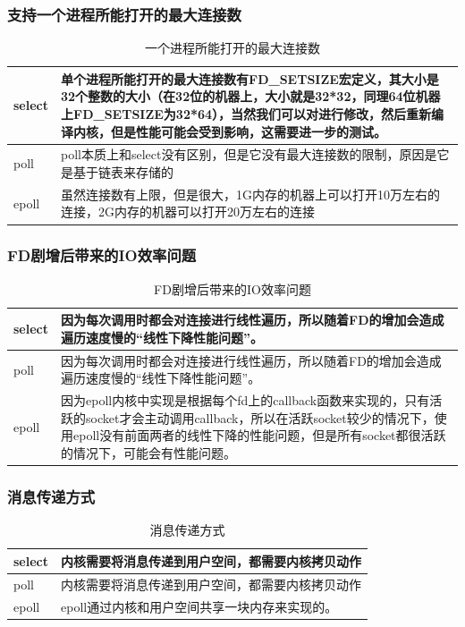 \documentclass[UTF8,a4paper,8pt]{ctexbook}
\begin{document}
			\subsubsection{支持一个进程所能打开的最大连接数}
				\begin{table}[H]
					\centering
					\caption{一个进程所能打开的最大连接数}
					\begin{tabular}{l|m{14cm}}
						\hline
						select		& 单个进程所能打开的最大连接数有FD\_SETSIZE宏定义，其大小是32个整数的大小（在32位的机器上，大小就是32*32，同理64位机器上FD\_SETSIZE为32*64），当然我们可以对进行修改，然后重新编译内核，但是性能可能会受到影响，这需要进一步的测试。\\
						\hline
						poll		& poll本质上和select没有区别，但是它没有最大连接数的限制，原因是它是基于链表来存储的\\
						\hline
						epoll		& 虽然连接数有上限，但是很大，1G内存的机器上可以打开10万左右的连接，2G内存的机器可以打开20万左右的连接\\
						\hline
					\end{tabular}
				\end{table}
			\subsubsection{FD剧增后带来的IO效率问题}
				\begin{table}[H]
					\centering
					\caption{FD剧增后带来的IO效率问题}
					\begin{tabular}{l|m{14cm}}
						\hline
						select		& 因为每次调用时都会对连接进行线性遍历，所以随着FD的增加会造成遍历速度慢的“线性下降性能问题”。\\
						\hline
						poll		& 因为每次调用时都会对连接进行线性遍历，所以随着FD的增加会造成遍历速度慢的“线性下降性能问题”。\\
						\hline
						epoll		& 因为epoll内核中实现是根据每个fd上的callback函数来实现的，只有活跃的socket才会主动调用callback，所以在活跃socket较少的情况下，使用epoll没有前面两者的线性下降的性能问题，但是所有socket都很活跃的情况下，可能会有性能问题。\\
						\hline
					\end{tabular}
				\end{table}
			\subsubsection{消息传递方式}
				\begin{table}[H]
					\centering
					\caption{消息传递方式}
					\begin{tabular}{l|m{14cm}}
						\hline
						select		& 内核需要将消息传递到用户空间，都需要内核拷贝动作\\
						\hline
						poll		& 内核需要将消息传递到用户空间，都需要内核拷贝动作\\
						\hline
						epoll		& epoll通过内核和用户空间共享一块内存来实现的。\\
						\hline
					\end{tabular}
				\end{table}
			
\end{document}
